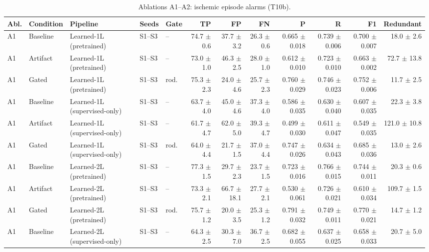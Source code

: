 \begin{table}[htbp]
\centering
\small
\caption{Ablations A1--A2: ischemic episode alarms (T10b).}
\label{tab:t10_alarms}
\begin{tabular}{lllllrrrrrrr}
\toprule
Abl. & Condition & Pipeline & Seeds & Gate & TP & FP & FN & P & R & F1 & Redundant \\
\midrule
A1 & Baseline & Learned-1L (pretrained) & S1--S3 & -- & 74.7 $\pm$ 0.6 & 37.7 $\pm$ 3.2 & 26.3 $\pm$ 0.6 & 0.665 $\pm$ 0.018 & 0.739 $\pm$ 0.006 & 0.700 $\pm$ 0.007 & 18.0 $\pm$ 2.6 \\
A1 & Artifact & Learned-1L (pretrained) & S1--S3 & -- & 73.0 $\pm$ 1.0 & 46.3 $\pm$ 2.5 & 28.0 $\pm$ 1.0 & 0.612 $\pm$ 0.010 & 0.723 $\pm$ 0.010 & 0.663 $\pm$ 0.002 & 72.7 $\pm$ 13.8 \\
A1 & Gated & Learned-1L (pretrained) & S1--S3 & rod. & 75.3 $\pm$ 2.3 & 24.0 $\pm$ 4.6 & 25.7 $\pm$ 2.3 & 0.760 $\pm$ 0.029 & 0.746 $\pm$ 0.023 & 0.752 $\pm$ 0.006 & 11.7 $\pm$ 2.5 \\
\midrule
A1 & Baseline & Learned-1L (supervised-only) & S1--S3 & -- & 63.7 $\pm$ 4.0 & 45.0 $\pm$ 4.6 & 37.3 $\pm$ 4.0 & 0.586 $\pm$ 0.035 & 0.630 $\pm$ 0.040 & 0.607 $\pm$ 0.035 & 22.3 $\pm$ 3.8 \\
A1 & Artifact & Learned-1L (supervised-only) & S1--S3 & -- & 61.7 $\pm$ 4.7 & 62.0 $\pm$ 5.0 & 39.3 $\pm$ 4.7 & 0.499 $\pm$ 0.030 & 0.611 $\pm$ 0.047 & 0.549 $\pm$ 0.035 & 121.0 $\pm$ 10.8 \\
A1 & Gated & Learned-1L (supervised-only) & S1--S3 & rod. & 64.0 $\pm$ 4.4 & 21.7 $\pm$ 1.5 & 37.0 $\pm$ 4.4 & 0.747 $\pm$ 0.026 & 0.634 $\pm$ 0.043 & 0.685 $\pm$ 0.036 & 13.0 $\pm$ 2.6 \\
\midrule
A1 & Baseline & Learned-2L (pretrained) & S1--S3 & -- & 77.3 $\pm$ 1.5 & 29.7 $\pm$ 2.3 & 23.7 $\pm$ 1.5 & 0.723 $\pm$ 0.016 & 0.766 $\pm$ 0.015 & 0.744 $\pm$ 0.011 & 20.3 $\pm$ 0.6 \\
A1 & Artifact & Learned-2L (pretrained) & S1--S3 & -- & 73.3 $\pm$ 2.1 & 66.7 $\pm$ 18.1 & 27.7 $\pm$ 2.1 & 0.530 $\pm$ 0.061 & 0.726 $\pm$ 0.021 & 0.610 $\pm$ 0.034 & 109.7 $\pm$ 1.5 \\
A1 & Gated & Learned-2L (pretrained) & S1--S3 & rod. & 75.7 $\pm$ 1.2 & 20.0 $\pm$ 3.5 & 25.3 $\pm$ 1.2 & 0.791 $\pm$ 0.032 & 0.749 $\pm$ 0.011 & 0.770 $\pm$ 0.021 & 14.7 $\pm$ 1.2 \\
\midrule
A1 & Baseline & Learned-2L (supervised-only) & S1--S3 & -- & 64.3 $\pm$ 2.5 & 30.3 $\pm$ 7.0 & 36.7 $\pm$ 2.5 & 0.682 $\pm$ 0.055 & 0.637 $\pm$ 0.025 & 0.658 $\pm$ 0.033 & 20.7 $\pm$ 5.0 \\

\end{tabular}
\end{table}
